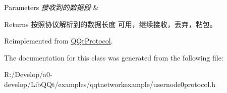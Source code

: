\begin{DoxyParams}{Parameters}
{\em 接收到的数据段} & \\
\hline
\end{DoxyParams}
\begin{DoxyReturn}{Returns}
按照协议解析到的数据长度 可用，继续接收，丢弃，粘包。 
\end{DoxyReturn}


Reimplemented from \mbox{\hyperlink{class_q_qt_protocol_a00fd0c1ac23379ed3b9b25da9a34f39b}{Q\+Qt\+Protocol}}.



The documentation for this class was generated from the following file\+:\begin{DoxyCompactItemize}
\item 
R\+:/\+Develop/a0-\/develop/\+Lib\+Q\+Qt/examples/qqtnetworkexample/usernode0protocol.\+h\end{DoxyCompactItemize}
